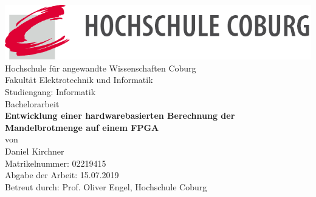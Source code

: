 \documentclass[a4paper,12pt,onesided]{report}
\begin{document}
\begin{titlepage}
	\centering
	\includegraphics[width=14.9cm]{img/logo}\\

	\fontsize{18}{20}\selectfont
	Hochschule für angewandte Wissenschaften Coburg\\[.1cm]
	Fakultät Elektrotechnik und Informatik\\[1.2cm]
	Studiengang: Informatik\\
	Bachelorarbeit\\[1.2cm]
	\fontsize{21}{23}\selectfont
	\textbf{Entwicklung einer hardwarebasierten Berechnung der 
	Mandelbrotmenge auf einem FPGA}\\[1cm]
	\fontsize{18}{20}\selectfont
	von\\[1.2cm]
	Daniel Kirchner\\
	Matrikelnummer: 02219415\\[1.2cm]
	Abgabe der Arbeit: 15.07.2019\\[1.2cm]

	Betreut durch: Prof. Oliver Engel, Hochschule Coburg
\end{titlepage}
\end{document}
